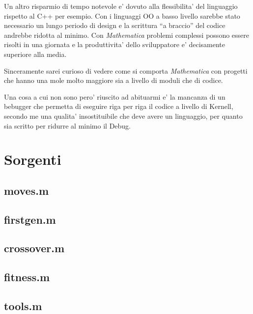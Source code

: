 \documentclass[12pt, a4paper]{article}
\begin{document}
Un altro risparmio di tempo notevole e' dovuto alla flessibilita' del linguaggio rispetto al C++ per esempio. Con i linguaggi OO a basso livello sarebbe stato necessario un lungo periodo di design e la scrittura ``a braccio'' del codice andrebbe ridotta al minimo. Con {\itshape Mathematica} problemi complessi possono essere risolti in una giornata e la produttivita' dello sviluppatore e' decisamente superiore alla media.

Sinceramente sarei curioso di vedere come si comporta {\itshape Mathematica} con progetti che hanno una mole molto maggiore sia a livello di moduli che di codice.

Una cosa a cui non sono pero' riuscito ad abituarmi e' la mancanza di  un bebugger che permetta di eseguire riga per riga il codice a livello di Kernell, secondo me una qualita' insostituibile che deve avere un linguaggio, per quanto sia scritto per ridurre al minimo il Debug.



\section{Sorgenti}
\label{sec:source}
\subsection{moves.m}

\subsection{firstgen.m}

\subsection{crossover.m}

\subsection{fitness.m}

\subsection{tools.m}

\end{document}
